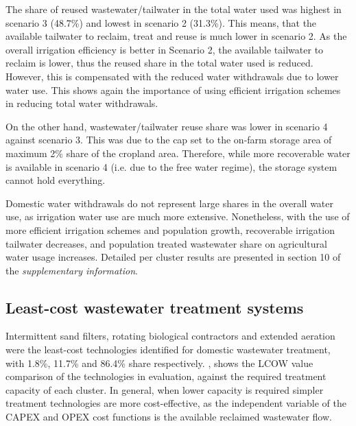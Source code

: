 The share of reused wastewater/tailwater in the total water used was highest in scenario 3 (48.7\%) and lowest in scenario 2 (31.3\%). This means, that the available tailwater to reclaim, treat and reuse is much lower in scenario 2. As the overall irrigation efficiency is better in Scenario 2, the available tailwater to reclaim is lower, thus the reused share in the total water used is reduced. However, this is compensated with the reduced water withdrawals due to lower water use. This shows again the importance of using efficient irrigation schemes in reducing total water withdrawals.

On the other hand, wastewater/tailwater reuse share was lower in scenario 4 against scenario 3. This was due to the cap set to the on-farm storage area of maximum 2\% share of the cropland area. Therefore, while more recoverable water is available in scenario 4 (i.e. due to the free water regime), the storage system cannot hold everything.

Domestic water withdrawals do not represent large shares in the overall water use, as irrigation water use are much more extensive. Nonetheless, with the use of more efficient irrigation schemes and population growth, recoverable irrigation tailwater decreases, and population treated wastewater share on agricultural water usage increases. Detailed per cluster results are presented in section 10 of the \textit{supplementary information}.

\subsection{Least-cost wastewater treatment systems}
Intermittent sand filters, rotating biological contractors and extended aeration were the least-cost technologies identified for domestic wastewater treatment, with 1.8\%, 11.7\% and 86.4\% share respectively. , shows the LCOW value comparison of the technologies in evaluation, against the required treatment capacity of each cluster. In general, when lower capacity is required simpler treatment technologies are more cost-effective, as the independent variable of the CAPEX and OPEX cost functions is the available reclaimed wastewater flow.


